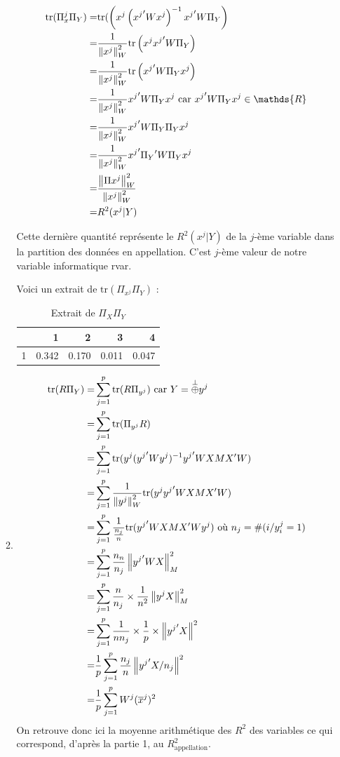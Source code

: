 \documentclass{article}
\begin{document}
\begin{enumerate}
\begin{enumerate}
\begin{align*}
\tr(\Pi_x^j \Pi_Y) =& \tr(\left(x^j\left( {x^j}' W x^j\right)^{-1} {x^j}' W \Pi_Y \right) \\
				   =& \frac{1}{\norme{x^j}_{W}^2} \tr\left(x^j {x^j}' W \Pi_Y\right) \\
				   =& \frac{1}{\norme{x^j}_{W}^2} \tr\left( {x^j}' W \Pi_Y x^j\right) \\
				   =& \frac{1}{\norme{x^j}_{W}^2}  {x^j}' W \Pi_Y x^j \text{ car } {x^j}' W \Pi_Y x^j \in \mathds{R} \\
				   =& \frac{1}{\norme{x^j}_{W}^2}  {x^j}' W \Pi_Y \Pi_Y x^j \\
				   =& \frac{1}{\norme{x^j}_{W}^2}  {x^j}' {\Pi_Y}' W  \Pi_Y x^j \\ 
				   =& \frac{\norme{\Pi x^j}_{W}^2}{\norme{x^j}_{W}^2} \\
				   =& R^2(x^j | Y)	     
\end{align*}	
	
	Cette dernière quantité représente le $R^2(x^j | Y)$ de la $j$-ème variable dans la partition des données en appellation. C'est $j$-ème valeur de notre variable informatique rvar.
	
	Voici un extrait de $\text{tr}(\Pi_{x^j} \Pi_Y)$ :	
	
	\begin{center}
\begin{table}[ht]
\centering
\begin{tabular}{rrrrr}
  \hline
 & 1 & 2 & 3 & 4 \\ 
  \hline
1 & 0.342 & 0.170 & 0.011 & 0.047 \\ 
   \hline
\end{tabular}
\caption{Extrait de $\Pi_X\Pi_Y$} 
\end{table}
	\end{center}
	
	\item \begin{align*}
	 \text{tr}(R \Pi_Y)=&\sum_{j=1}^p  \text{tr}(R \Pi_{y^j}) \text{ car } Y=\overset{\perp}{\oplus} y^j \\
	 =& \sum_{j=1}^p \text{tr}(\Pi_{y^j} R ) \\
	 =& \sum_{j=1}^p \text{tr}(y^j({y^j}'Wy^j)^{-1}{y^j}'WXMX'W)\\
	 =& \sum_{j=1}^p \frac{1}{\left\| y^j\right\|_W^2} \text{tr}(y^j {y^j}'WXMX'W) \\
	 =& \sum_{j=1}^p \frac{1}{\frac{n_{j}}{n}} \text{tr}({y^j}'WXMX'Wy^j ) \text{ où } n_{j}= \#(i/y_{i}^j=1)\\
	 =& \sum_{j=1}^p \frac{n_{n}}{n_j}\left\| {y^j}'WX\right\|_M^2 \\
	 =& \sum_{j=1}^p \frac{n}{n_j}\times \frac{1}{n^2} \left\| y^jX\right\|_M^2\\
	 =& \sum_{j=1}^p \frac{1}{n n_{j}} \times \frac{1}{p} \times \left\| {y^j}'X\right\|^2 \\
	 =& \frac{1}{p} \sum_{j=1}^p \frac{n_{j}}{n} \left\| {y^j}' X / n_j\right\|^2\\
	 =& \frac{1}{p} \sum_{j=1}^p W^j (\overline{x}^j)^2
	\end{align*}
	On retrouve donc ici la moyenne arithmétique des $R^2$ des variables ce qui correspond, d'après la partie 1, au $R^2_{\text{appellation}}$.
	

\end{enumerate}
\end{enumerate}
\end{document}
